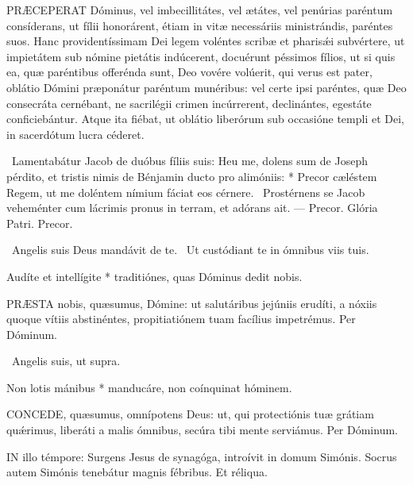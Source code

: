 \lettrine[lines=2]{P}{RÆCEPERAT} Dóminus, vel imbecillitátes, vel ætátes, vel penúrias paréntum consíderans, ut fílii honorárent, étiam in vitæ necessáriis ministrándis, paréntes suos. Hanc providentíssimam Dei legem voléntes scribæ et pharisǽi subvértere, ut impietátem sub nómine pietátis indúcerent, docuérunt péssimos fílios, ut si quis ea, quæ paréntibus offerénda sunt, Deo vovére volúerit, qui verus est pater, oblátio Dómini præponátur paréntum munéribus: vel certe ipsi paréntes, quæ Deo consecráta cernébant, ne sacrilégii crimen incúrrerent, declinántes, egestáte conficiebántur. Atque ita fiébat, ut oblátio liberórum sub occasióne templi et Dei, in sacerdótum lucra céderet.

\R\ Lamentabátur Jacob de duóbus fíliis suis: Heu me, dolens sum de Joseph pérdito, et tristis nimis de Bénjamin ducto pro alimóniis: * Precor cæléstem Regem, ut me doléntem nímium fáciat eos cérnere. \V\ Prostérnens se Jacob veheménter cum lácrimis pronus in terram, et adórans ait. --- Precor. Glória Patri. Precor.

\V\ Angelis suis Deus mandávit de te. \R\ Ut custódiant te in ómnibus viis tuis.

 Audíte et intellígite * traditiónes, quas Dóminus dedit nobis.


\lettrine[lines=2]{P}{RÆSTA} nobis, quæsumus, Dómine: ut salutáribus jejúniis erudíti, a nóxiis quoque vítiis abstinéntes, propitiatiónem tuam facílius impetrémus. Per Dóminum.

\V\ Angelis suis, ut supra.

 Non lotis mánibus * manducáre, non coínquinat hóminem.


\lettrine[lines=2]{C}{ONCEDE}, quæsumus, omnípotens Deus: ut, qui protectiónis tuæ grátiam quǽrimus, liberáti a malis ómnibus, secúra tibi mente serviámus. Per Dóminum.

\sectionornament




\lettrine[lines=2]{I}{N} illo témpore: Surgens Jesus de synagóga, introívit in domum Simónis. Socrus autem Simónis tenebátur magnis fébribus. Et réliqua.


